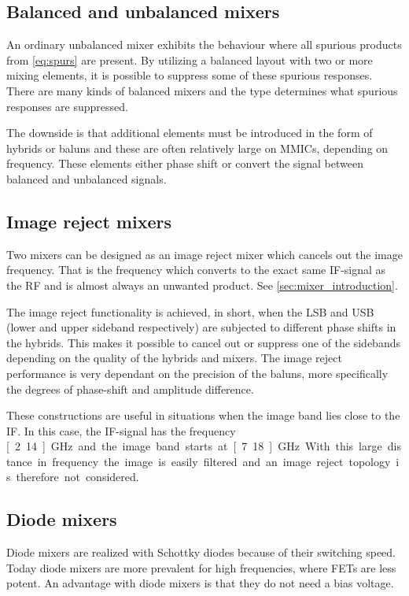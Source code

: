 		\subsection{Balanced and unbalanced mixers}
			An ordinary unbalanced mixer exhibits the behaviour where all spurious products from \autoref{eq:spurs} are present. By utilizing a balanced layout with two or more mixing elements, it is possible to suppress some of these spurious responses. There are many kinds of balanced mixers and the type determines what spurious responses are suppressed.\autocites{maas92}{dinari09}

			The downside is that additional elements must be introduced in the form of hybrids or baluns and these are often relatively large on MMICs, depending on frequency. These elements either phase shift or convert the signal between balanced and unbalanced signals.

		\subsection{Image reject mixers}
			Two mixers can be designed as an image reject mixer which cancels out the image frequency. That is the frequency which converts to the exact same IF-signal as the RF and is almost always an unwanted product. See \autoref{sec:mixer_introduction}.

			The image reject functionality is achieved, in short, when the LSB and USB (lower and upper sideband respectively) are subjected to different phase shifts in the hybrids. This makes it possible to cancel out or suppress one of the sidebands depending on the quality of the hybrids and mixers. The image reject performance is very dependant on the precision of the baluns, more specifically the degrees of phase-shift and amplitude difference.\autocite{henderson85} %

			These constructions are useful in situations when the image band lies close to the IF. In this case, the IF-signal has the frequency \unit[2.14]{GHz} and the image band starts at \unit[7.18]{GHz}. With this large distance in frequency the image is easily filtered and an image reject topology is therefore not considered.

		\subsection{Diode mixers}
			Diode mixers are realized with Schottky diodes because of their switching speed. Today diode mixers are more prevalent for high frequencies, where FETs are less potent. An advantage with diode mixers is that they do not need a bias voltage.

